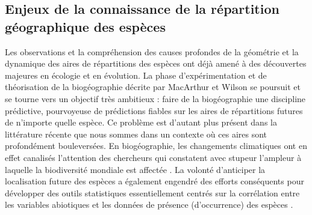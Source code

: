 \subsection*{Enjeux de la connaissance de la répartition géographique
des
espèces}\label{enjeux-de-la-connaissance-de-la-ruxe9partition-guxe9ographique-des-espuxe8ces}

Les observations et la compréhension des causes profondes de la
géométrie et la dynamique des aires de répartitions des espèces ont déjà
amené à des découvertes majeures en écologie et en évolution. La phase
d'expérimentation et de théorisation de la biogéographie décrite par
MacArthur et Wilson se poursuit et se tourne vers un objectif très
ambitieux : faire de la biogéographie une discipline prédictive,
pourvoyeuse de prédictions fiables sur les aires de répartitions futures
de n'importe quelle espèce. Ce problème est d'autant plus présent dans
la littérature récente que nous sommes dans un contexte où ces aires
sont profondément bouleversées. En biogéographie, les changements
climatiques ont en effet canalisés l'attention des chercheurs qui
constatent avec stupeur l'ampleur à laquelle la biodiversité mondiale
est affectée \citep{Koh2004, Bellard2012}. La volonté d'anticiper la
localisation future des espèces a également engendré des efforts
conséquents pour développer des outils statistiques essentiellement
centrés sur la corrélation entre les variables abiotiques et les données
de présence (d'occurrence) des espèces \citep{Elith2006}.


